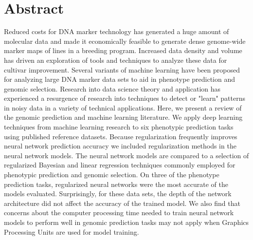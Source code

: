 \chapter*{Abstract}

Reduced costs for DNA marker technology has generated a huge amount of
molecular data and made it economically feasible to generate dense
genome-wide marker maps of lines in a breeding program. Increased
data density and volume has driven an exploration of tools and techniques
to analyze these data for cultivar improvement. Several variants of
machine learning have been proposed for analyzing large DNA marker
data sets to aid in phenotype prediction and genomic selection.
Research into data science theory and application has experienced a resurgence of research into 
techniques to detect or "learn" patterns in noisy data in a variety of 
technical applications. Here, we present a review of the genomic prediction 
and machine learning literature. We apply deep learning techniques 
from machine learning research to six phenotypic prediction tasks using 
published reference datasets. Because regularization frequently improves 
neural network prediction accuracy we included regularization methods in the neural network models.
The neural network models are compared to a selection of regularized Bayesian 
and linear regression techniques commonly employed for phenotypic prediction and genomic
selection. On three of the phenotype prediction tasks, regularized neural networks 
were the most accurate of the models evaluated. Surprisingly, for these data sets, the
depth of the network architecture did not affect the accuracy of 
the trained model. We also find that concerns about the computer processing 
time needed to train neural network models to perform well in genomic prediction 
tasks may not apply when Graphics Processing Units are used for model training.



